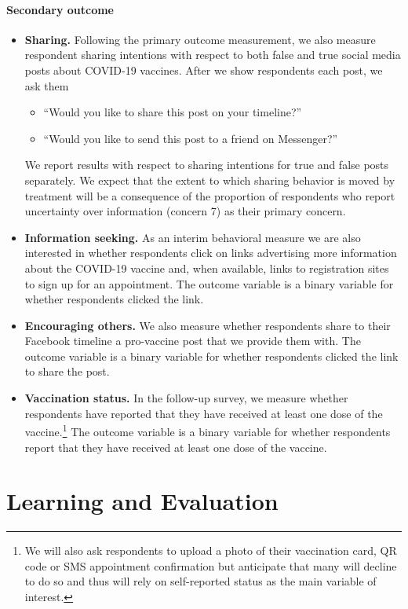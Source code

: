 \documentclass[letterpaper, 12pt, parskip=full,DIV=10]{scrartcl}
\begin{document}
\paragraph{Secondary outcome}
\begin{itemize}
\item \textbf{Sharing.} Following the primary outcome measurement, we also measure respondent sharing intentions with respect to both false and true social media posts about COVID-19 vaccines. After we show respondents each post, we ask them 
\begin{itemize}
  \item “Would you like to share this post on your timeline?”
  \item “Would you like to send this post to a friend on Messenger?”
\end{itemize}
We report results with respect to sharing intentions for true and false posts separately. We expect that the extent to which sharing behavior is moved by treatment will be a consequence of the proportion of respondents who report uncertainty over information (concern 7) as their primary concern. 
\item \textbf{Information seeking.} As an interim behavioral measure we are also interested in whether respondents click on links advertising more information about the COVID-19 vaccine and, when available, links to registration sites to sign up for an appointment. The outcome variable is a binary variable for whether respondents clicked the link. 
\item \textbf{Encouraging others.} We also measure whether respondents share to their Facebook timeline a pro-vaccine post that we provide them with. The outcome variable is a binary variable for whether respondents clicked the link to share the post. 
\item \textbf{Vaccination status.} In the follow-up survey, we measure whether respondents have reported that they have received at least one dose of the vaccine.\footnote{We will also ask respondents to upload a photo of their vaccination card, QR code or SMS appointment confirmation but anticipate that many will decline to do so and thus will rely on self-reported status as the main variable of interest.} The outcome variable is a binary variable for whether respondents report that they have received at least one dose of the vaccine. 
\end{itemize}

\section{Learning and Evaluation}
\end{document}
